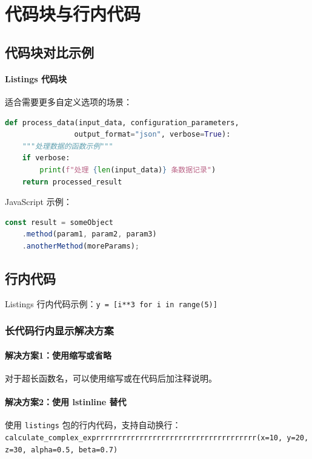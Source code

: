 \documentclass[../main]{subfiles}
\begin{document}
\section{代码块与行内代码}

\subsection{代码块对比示例}

\paragraph{Listings 代码块}
适合需要更多自定义选项的场景：
\begin{lstlisting}[language=Python, caption=Python 函数示例]
def process_data(input_data, configuration_parameters,
                output_format="json", verbose=True):
    """处理数据的函数示例"""
    if verbose:
        print(f"处理 {len(input_data)} 条数据记录")
    return processed_result
\end{lstlisting}

JavaScript 示例：
\begin{lstlisting}[language=JavaScript, caption=JavaScript 链式调用示例]
const result = someObject
    .method(param1, param2, param3)
    .anotherMethod(moreParams);
\end{lstlisting}

\subsection{行内代码}

Listings 行内代码示例：\lstinline{y = [i**3 for i in range(5)]}

\subsubsection{长代码行内显示解决方案}

\paragraph{解决方案1：使用缩写或省略}
对于超长函数名，可以使用缩写或在代码后加注释说明。

\paragraph{解决方案2：使用 lstinline 替代}
使用 \texttt{listings} 包的行内代码，支持自动换行：\\
\lstinline[breaklines=true]{calculate_complex_exprrrrrrrrrrrrrrrrrrrrrrrrrrrrrrrrrrrrr(x=10, y=20, z=30, alpha=0.5, beta=0.7)}
\end{document}
